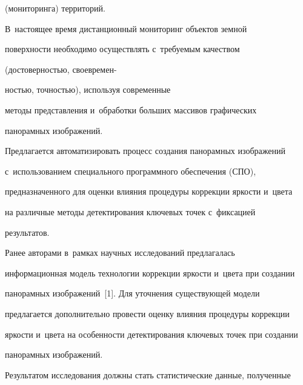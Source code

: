 (мониторинга) территорий. 


  


  В~настоящее время дистанционный мониторинг объектов земной 


по\-верх\-ности необходимо осуществлять с~тре\-бу\-емым качеством 


(до\-сто\-вер\-ностью, сво\-е\-вре\-мен-\linebreak\vspace*{-12pt}





\pagebreak





\noindent


ностью, точ\-ностью), используя современные 


методы пред\-став\-ле\-ния и~обработки больших массивов графических 


па\-но\-рам\-ных изображений.


  


  Предлагается автоматизировать процесс создания па\-но\-рам\-ных изображений 


с~использованием специального программного обеспечения (СПО), 


предназначенного для оценки влияния процедуры коррекции яр\-кости и~цвета 


на различные методы детектирования ключевых точек с~фик\-са\-ци\-ей 


результатов. 


  


  Ранее авторами в~рамках научных исследований предлагалась 


информационная модель технологии коррекции яр\-кости и~цвета при создании 


па\-но\-рам\-ных изображений~[1]. Для уточнения су\-ще\-ст\-ву\-ющей модели 


предлагается дополнительно провести оценку влияния процедуры коррекции 


яр\-кости и~цвета на особенности де\-тек\-ти\-ро\-ва\-ния ключевых точек при создании 


па\-но\-рам\-ных изображений.


  


  Результатом исследования долж\-ны стать статистические данные, полученные 


